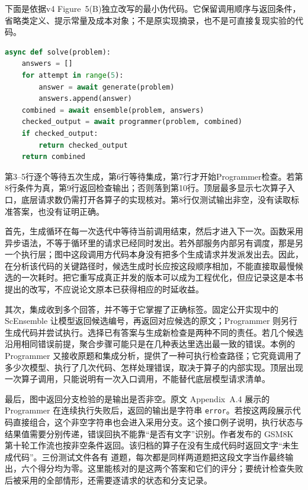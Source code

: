 下面是依据v4 Figure~5(B)独立改写的最小伪代码。它保留调用顺序与返回条件，省略类定义、提示常量及成本对象；不是原实现摘录，也不是可直接复现实验的代码。

\noindent\begin{minipage}{\linewidth}
\begin{lstlisting}[language=Python,caption={AFlow GSM8K示例的控制流教学改写},label={lst:ch09-aflow},firstnumber=1]
async def solve(problem):
    answers = []
    for attempt in range(5):
        answer = await generate(problem)
        answers.append(answer)
    combined = await ensemble(problem, answers)
    checked_output = await programmer(problem, combined)
    if checked_output:
        return checked_output
    return combined
\end{lstlisting}
\end{minipage}

第3--5行逐个等待五次生成，第6行等待集成，第7行才开始Programmer检查。若第8行条件为真，第9行返回检查输出；否则落到第10行。顶层最多显示七次算子入口，底层请求数仍需打开各算子的实现核对。第8行仅测试输出非空，没有读取标准答案，也没有证明正确。

首先，生成循环在每一次迭代中等待当前调用结束，然后才进入下一次。函数采用异步语法，不等于循环里的请求已经同时发出。若外部服务内部另有调度，那是另一个执行层；图中这段调用方代码本身没有把多个生成请求并发派发出去。因此，在分析该代码的关键路径时，候选生成时长应按这段顺序相加，不能直接取最慢候选的一次耗时。把它重写成真正并发的版本可以成为工程优化，但应记录这是本书提出的改写，不应说论文原本已获得相应的时延收益。

其次，集成收到多个回答，并不等于它掌握了正确标签。固定公开实现中的 ScEnsemble 让模型返回候选编号，再返回对应候选的原文；Programmer 则另行生成代码并尝试执行\cite{aflow-code-2025}。选择已有答案与生成新检查是两种不同的责任。若几个候选沿用相同错误前提，聚合步骤可能只是在几种表达里选出最一致的错误。本例的 Programmer 又接收原题和集成分析，提供了一种可执行检查路径；它究竟调用了多少次模型、执行了几次代码、怎样处理错误，取决于算子的内部实现。顶层出现一次算子调用，只能说明有一次入口调用，不能替代底层模型请求清单。

最后，图中返回分支检验的是输出是否非空。原文 Appendix~A.4 展示的 Programmer 在连续执行失败后，返回的输出是字符串 \texttt{error}\cite{aflow-2410}。若按这两段展示代码直接组合，这个非空字符串也会进入采用分支。这个接口例子说明，执行状态与结果值需要分别传递，错误回执不能靠“是否有文字”识别。作者发布的 GSM8K 第十轮工作流也按非空条件返回。该归档的算子在没有生成代码时返回文字“未生成代码”。三份测试文件各有  道题，每次都是同样两道题把这段文字当作最终输出，六个得分均为零\cite{aflow-code-2025}。这里能核对的是这两个答案和它们的评分；要统计检查失败后被采用的全部情形，还需要逐请求的状态和分支记录。

